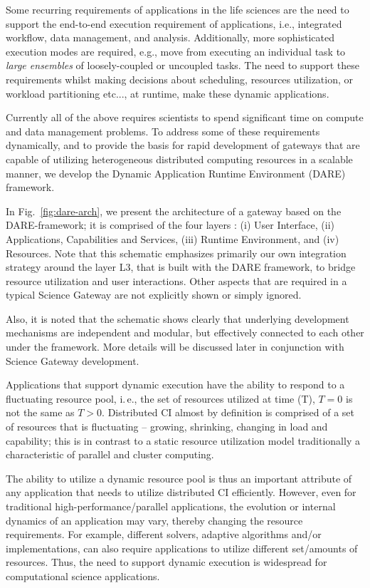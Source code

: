 \documentclass[]{svjour3}
\begin{document}
Some recurring requirements of applications in the life sciences are
the need to support the end-to-end execution requirement of
applications, i.e., integrated workflow, data management, and
analysis. Additionally, more sophisticated execution modes are
required, e.g., move from executing an individual task to
\textit{large ensembles} of loosely-coupled or uncoupled tasks. The
need to support these requirements whilst making decisions about
scheduling, resources utilization, or workload partitioning etc..., at
runtime, make these dynamic applications.

Currently all of the above requires scientists to spend significant
time on compute and data management problems. To address some of
these requirements dynamically, and to provide the basis for
rapid development of gateways that are capable of utilizing
heterogeneous distributed computing resources in a scalable manner, we
develop the Dynamic Application Runtime Environment (DARE)
framework\cite{dareurl}.

In Fig.~\ref{fig:dare-arch}, we present the architecture of a gateway
based on the DARE-framework; it is comprised of the four layers : (i)
User Interface, (ii) Applications, Capabilities and Services, (iii)
Runtime Environment, and (iv) Resources. Note that this schematic
emphasizes primarily our own integration strategy around the layer 
L3, that is built with the DARE framework, to bridge resource
utilization and user interactions. Other aspects that
are required in a typical Science Gateway are not explicitly shown or
simply ignored.

Also, it is noted that the schematic shows clearly that underlying
development mechanisms are independent and modular, but effectively
connected to each other under the framework. More details will be
discussed later in conjunction with Science Gateway development.

Applications that support dynamic execution have the ability to
respond to a fluctuating resource pool, i.\,e., the set of resources
utilized at time (T), $T=0$ is not the same as $T>0$. Distributed CI
almost by definition is comprised of a set of resources that is
fluctuating -- growing, shrinking, changing in load and capability;
this is in contrast to a static resource utilization model
traditionally a characteristic of parallel and cluster computing.

The ability to utilize a dynamic resource pool is thus an important
attribute of any application that needs to utilize distributed CI
efficiently.  However, even for traditional high-performance/parallel
applications, the evolution or internal dynamics of an application may
vary, thereby changing the resource requirements.  For example,
different solvers, adaptive algorithms and/or implementations, can
also require applications to utilize different set/amounts of
resources.  Thus, the need to support dynamic execution is widespread
for computational science applications.
\end{document}
